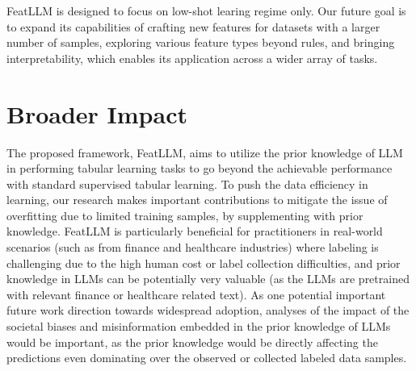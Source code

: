 \textsf{FeatLLM} is designed to focus on low-shot learing regime only. Our future goal is to expand its capabilities of crafting new features for datasets with a larger number of samples, exploring various feature types beyond rules, and bringing interpretability, which enables its application across a wider array of tasks.  

\section{Broader Impact} The proposed framework, \textsf{FeatLLM}, aims to utilize the prior knowledge of LLM in performing tabular learning tasks to go beyond the achievable performance with standard supervised tabular learning. To push the data efficiency in learning, our research makes important contributions to mitigate the issue of overfitting due to limited training samples, by supplementing with prior knowledge. \textsf{FeatLLM} is particularly beneficial for practitioners in real-world scenarios (such as from finance and healthcare industries) where labeling is challenging due to the high human cost or label collection difficulties, and prior knowledge in LLMs can be potentially very valuable (as the LLMs are pretrained with relevant finance or healthcare related text). As one potential important future work direction towards widespread adoption, analyses of the impact of the societal biases and misinformation embedded in the prior knowledge of LLMs would be important, as the prior knowledge would be directly affecting the predictions even dominating over the observed or collected labeled data samples. 

